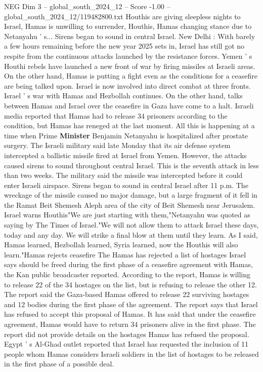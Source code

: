 \begin{textsample}{NEG Dim 3 – global\_south\_2024\_12 – Score -1.00 – global\_south\_2024\_12/119482800.txt}  \label{ex:f3_neg_062}
Houthis are giving sleepless nights to Israel, Hamas is unwilling to surrender, Houthis, Hamas changing stance due to Netanyahu ' s...
Sirens began to sound in central Israel.
New Delhi : With barely a few hours remaining before the new year 2025 sets in, Israel has still got no respite from the continuous attacks launched by the resistance forces.
Yemen ' s Houthi rebels have launched a new front of war by firing missiles at Israeli areas.
On the other hand, Hamas is putting a fight even as the conditions for a ceasefire are being talked upon.
Israel is now involved into direct combat at three fronts.
Israel ' s war with Hamas and Hezbollah continues.
On the other hand, talks between Hamas and Israel over the ceasefire in Gaza have come to a halt.
Israeli media reported that Hamas had to release 34 prisoners according to the condition, but Hamas has reneged at the last moment.
All this is happening at a time when Prime \textbf{Minister} Benjamin Netanyahu is hospitalized after prostate surgery.
The Israeli military said late Monday that its air defense system intercepted a ballistic missile fired at Israel from Yemen.
However, the attacks caused sirens to sound throughout central Israel.
This is the seventh attack in less than two weeks.
The military said the missile was intercepted before it could enter Israeli airspace.
Sirens began to sound in central Israel after 11 p.m.
The wreckage of the missile caused no major damage, but a large fragment of it fell in the Ramat Beit Shemesh Aleph area of the city of Beit Shemesh near Jerusalem.
Israel warns Houthis"We are just starting with them,"Netanyahu was quoted as saying by The Times of Israel."We will not allow them to attack Israel these days, today and any day.
We will strike a final blow at them until they learn.
As I said, Hamas learned, Hezbollah learned, Syria learned, now the Houthis will also learn."Hamas rejects ceasefire The Hamas has rejected a list of hostages Israel says should be freed during the first phase of a ceasefire agreement with Hamas, the Kan public broadcaster reported.
According to the report, Hamas is willing to release 22 of the 34 hostages on the list, but is refusing to release the other 12.
The report said the Gaza-based Hamas offered to release 22 surviving hostages and 12 bodies during the first phase of the agreement.
The report says that Israel has refused to accept this proposal of Hamas.
It has said that under the ceasefire agreement, Hamas would have to return 34 prisoners alive in the first phase.
The report did not provide details on the hostages Hamas has refused the proposal.
Egypt ' s Al-Ghad outlet reported that Israel has requested the inclusion of 11 people whom Hamas considers Israeli soldiers in the list of hostages to be released in the first phase of a possible deal.

\end{textsample}

